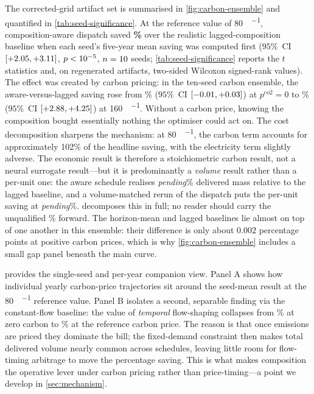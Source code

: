 \documentclass[11pt]{article}
\providecommand{\lngDecompCarbonSharePct}{102}                 %
\providecommand{\lngDecompDeliveredMassDeltaPct}{\emph{pending}}
\providecommand{\lngVolmatchSavingPct}{\emph{pending}}
\begin{document}
The corrected-grid artifact set is summarised in \cref{fig:carbon-ensemble}
and quantified in \cref{tab:seed-significance}. At the
reference value of \SI{80}{\EUR\per\tCOtwo}, composition-aware dispatch saved
\textbf{\lngHeadlineSavingVsLaggedPct\%} over the realistic lagged-composition
baseline when each seed's five-year mean saving was computed first ($95\%$~CI
$[+2.05, +3.11]$,
$p<10^{-5}$, $n=10$ seeds;
\cref{tab:seed-significance} reports the $t$ statistics and, on regenerated
artifacts, two-sided Wilcoxon signed-rank values). The effect was created by
carbon pricing: in the ten-seed carbon ensemble, the aware-versus-lagged saving
rose from \lngEnsembleSavingAtZeroPct\% ($95\%$~CI
$[-0.01, +0.03]$) at
$p^{\text{co2}}=0$ to \lngEnsembleSavingAtOneSixZeroPct\% ($95\%$~CI
$[+2.88,
+4.25]$) at \SI{160}{\EUR\per\tCOtwo}.
Without a carbon price, knowing the composition bought essentially nothing the
optimiser could act on. The cost decomposition sharpens the mechanism: at
\SI{80}{\EUR\per\tCOtwo}, the carbon term accounts for approximately
\lngDecompCarbonSharePct\% of the headline saving, with the electricity term
slightly adverse. The economic result is therefore a stoichiometric
carbon result, not a neural surrogate result---but it is predominantly a
\emph{volume} result rather than a per-unit one: the aware schedule realises
\lngDecompDeliveredMassDeltaPct\% delivered mass relative to the lagged
baseline, and a volume-matched rerun of the dispatch puts the per-unit saving
at \lngVolmatchSavingPct\%.  decomposes this in full; no
reader should carry the unqualified \lngHeadlineSavingVsLaggedPct\% forward.
The horizon-mean and lagged baselines lie almost on top of one another in this
ensemble: their difference is only about $0.002$ percentage points at positive
carbon prices, which is why \cref{fig:carbon-ensemble} includes a small gap
panel beneath the main curve.

 provides the single-seed and per-year companion view. Panel A
shows how individual yearly carbon-price trajectories sit around the seed-mean
result at the \SI{80}{\EUR\per\tCOtwo} reference value. Panel B isolates a
second, separable finding via the constant-flow baseline:
the value of \emph{temporal} flow-shaping collapses from
\lngSingleSeedConstantFlowSavingAtZeroPct\% at zero carbon to
\lngSingleSeedConstantFlowSavingAtEightZeroPct\% at the reference carbon
price. The reason is that once
emissions are priced they dominate the bill; the fixed-demand constraint then
makes total delivered volume nearly common across schedules, leaving little room
for flow-timing arbitrage to move the percentage saving.
This is what makes composition the operative lever under carbon pricing
rather than price-timing---a point we develop in \cref{sec:mechanism}.
\end{document}
